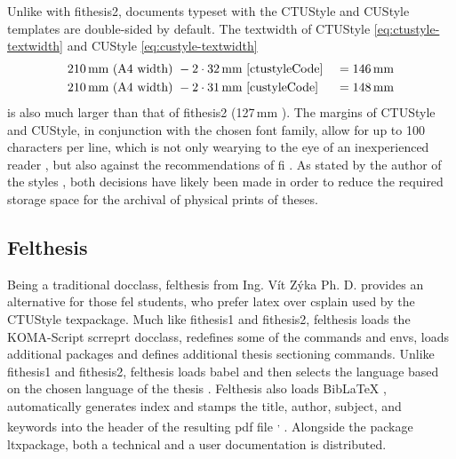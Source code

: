 \documentclass[12pt,twoside,cover,color,table]%
  {fithesis3/fithesis3/fithesis3} %
\begin{document}
  Unlike with \textsf{fithesis2}, documents typeset with the
  CTUStyle and CUStyle templates are double-sided by default. The
  \gls{textwidth} of CTUStyle \eqref{eq:ctustyle-textwidth} and
  CUStyle \eqref{eq:custyle-textwidth}\begin{align}
    \label{eq:ctustyle-textwidth} 210\text{\,mm}\text{ (A4 width) }
      &- 2\cdot32\text{\,mm} \text{ \cite[line~249]{ctustyleCode} }
      &= 146\text{\,mm} \\
    \label{eq:custyle-textwidth}  210\text{\,mm}\text{ (A4 width) }
      &- 2\cdot31\text{\,mm} \text{ \cite[line~229]{custyleCode} }
      &= 148\text{\,mm}
  \end{align} is also much larger than that of \textsf{fithesis2}
  (127\,mm \cite[lines~989, 1017, 1045]{fithesis2Code}). The
  margins of CTUStyle and CUStyle, in conjunction with the chosen
  font family, \label{overlong-lines} allow for up to 100
  characters per line, which is not only wearying to the eye of an
  inexperienced reader \cite[section~2.1.2]{eletypostyle}, but also
  against the recommendations of \gls{fi}
  \cite[section~3.2.3]{bpdpfi}. As stated by the author of the
  styles \cite[post~25]{ctustyle-forums}, both decisions have
  likely been made in order to reduce the required storage space
  for the archival of physical prints of theses.

  \subsection{Felthesis}\label{sec:felthesis}
  Being a traditional \gls{docclass}, felthesis from Ing. Vít Zýka
  Ph. D. provides an alternative for those \gls{fel} students, who
  prefer \gls{latex} over \gls{csplain} used by the CTUStyle
  \gls{texpackage}. Much like \textsf{fithesis1} and
  \textsf{fithesis2}, felthesis loads the KOMA-Script scrreprt
  \gls{docclass}, redefines some of the commands and \glspl{env},
  loads additional packages and defines additional thesis
  sectioning commands. Unlike \textsf{fithesis1} and
  \textsf{fithesis2}, felthesis loads babel and then selects the
  language based on the chosen language of the thesis
  \cite[lines~687--691]{felthesisCode}. Felthesis also loads Bib\LaTeX\pending{}
  \cite[line~722]{felthesisCode}, automatically generates
  index\pending{} \cite[line~763]{felthesisCode} and stamps the
  title, author, subject, and keywords into the header of the
  resulting \gls{pdf} file \cite[lines~959--971]{felthesisCode}
  \label{pdf-stamping}\textsuperscript{,}
  . Alongside the package
  \gls{ltxpackage}, both a technical \cite{felthesisCode} and a
  user documentation \cite{felthesis} is
  distributed\pending{}.
\end{document}
